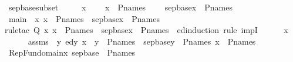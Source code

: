 \begin{isabellebody}
{\isafoldproof}%
%
\isadelimproof
\isanewline
%
\endisadelimproof
\isanewline
{}\isamarkupfalse%
\ sep{\isacharunderscore}{\kern0pt}base{\isacharunderscore}{\kern0pt}subset\ {\isacharcolon}{\kern0pt}\ \isanewline
\ \ \ x\ \isanewline
\ \ \ {\isachardoublequoteopen}x\ {\isasymin}\ P{\isacharunderscore}{\kern0pt}names{\isachardoublequoteclose}\ \isanewline
\ \ \ {\isachardoublequoteopen}sep{\isacharunderscore}{\kern0pt}base{\isacharparenleft}{\kern0pt}x{\isacharparenright}{\kern0pt}\ {\isasymsubseteq}\ P{\isacharunderscore}{\kern0pt}names{\isachardoublequoteclose}\isanewline
%
\isadelimproof
%
\endisadelimproof
%
\isatagproof
{}\isamarkupfalse%
{\isacharminus}{\kern0pt}\ \isanewline
\ \ \isamarkupfalse%
\ main\ {\isacharcolon}{\kern0pt}\ {\isachardoublequoteopen}{\isasymAnd}x{\isachardot}{\kern0pt}\ x\ {\isasymin}\ P{\isacharunderscore}{\kern0pt}names\ {\isasymlongrightarrow}\ sep{\isacharunderscore}{\kern0pt}base{\isacharparenleft}{\kern0pt}x{\isacharparenright}{\kern0pt}\ {\isasymsubseteq}\ P{\isacharunderscore}{\kern0pt}names{\isachardoublequoteclose}\ \isanewline
\ \ \isamarkupfalse%
{\isacharparenleft}{\kern0pt}rule{\isacharunderscore}{\kern0pt}tac\ Q{\isacharequal}{\kern0pt}{\isachardoublequoteopen}{\isasymlambda}\ x{\isachardot}{\kern0pt}\ x\ {\isasymin}\ P{\isacharunderscore}{\kern0pt}names\ {\isasymlongrightarrow}\ sep{\isacharunderscore}{\kern0pt}base{\isacharparenleft}{\kern0pt}x{\isacharparenright}{\kern0pt}\ {\isasymsubseteq}\ P{\isacharunderscore}{\kern0pt}names{\isachardoublequoteclose}\ \ ed{\isacharunderscore}{\kern0pt}induction{\isacharcomma}{\kern0pt}\ rule\ impI{\isacharparenright}{\kern0pt}\isanewline
\ \ \ \ \isamarkupfalse%
\ x\ \isanewline
\ \ \ \ \isamarkupfalse%
\ assms\ {\isacharcolon}{\kern0pt}\ {\isachardoublequoteopen}{\isacharparenleft}{\kern0pt}{\isasymAnd}y{\isachardot}{\kern0pt}\ ed{\isacharparenleft}{\kern0pt}y{\isacharcomma}{\kern0pt}\ x{\isacharparenright}{\kern0pt}\ {\isasymLongrightarrow}\ y\ {\isasymin}\ P{\isacharunderscore}{\kern0pt}names\ {\isasymlongrightarrow}\ sep{\isacharunderscore}{\kern0pt}base{\isacharparenleft}{\kern0pt}y{\isacharparenright}{\kern0pt}\ {\isasymsubseteq}\ P{\isacharunderscore}{\kern0pt}names{\isacharparenright}{\kern0pt}{\isachardoublequoteclose}\ {\isachardoublequoteopen}x\ {\isasymin}\ P{\isacharunderscore}{\kern0pt}names{\isachardoublequoteclose}\isanewline
\ \ \ \ \isamarkupfalse%
\ {\isachardoublequoteopen}{\isasymUnion}RepFun{\isacharparenleft}{\kern0pt}domain{\isacharparenleft}{\kern0pt}x{\isacharparenright}{\kern0pt}{\isacharcomma}{\kern0pt}\ sep{\isacharunderscore}{\kern0pt}base{\isacharparenright}{\kern0pt}\ {\isasymsubseteq}\ P{\isacharunderscore}{\kern0pt}names{\isachardoublequoteclose}\ \isanewline

\end{isabellebody}
